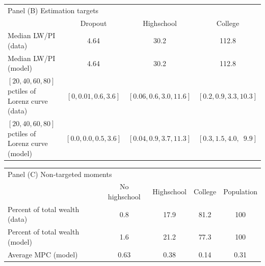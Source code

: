 \documentclass[11pt]{article}
\begin{document}
\begin{table}[th]
\begin{center}
	\begin{tabular}{lccc}
	\multicolumn{4}{l}{Panel (B) Estimation targets} \\ 
	& Dropout & Highschool & College \\ \midrule
	Median LW/PI (data) & 4.64 & 30.2 & 112.8 \\ 
	Median LW/PI (model) & 4.64 & 30.2 & 112.8 \\
	 $[20,40,60,80]$ pctiles of Lorenz curve (data) & $[0, 0.01, 0.6, 3.6]$ & $[0.06, 0.6, 3.0, 11.6]$ & $[0.2, 0.9, 3.3, 10.3]$ \\
	$[20,40,60,80]$ pctiles of Lorenz curve (model) & $[0.0, 0.0, 0.5, 3.6]$ & $[0.04, 0.9, 3.7, 11.3]$ & $[0.3, 1.5, 4.0, \phantom{0}9.9]$
	\\ \bottomrule 
	\end{tabular}
\end{center}
\end{table}

\begin{table}[th]
\begin{center}		
	\begin{tabular}{lcccc}
	\multicolumn{5}{l}{Panel (C) Non-targeted moments} \\ 
	& No highschool & Highschool & College & Population \\ \midrule
	Percent of total wealth (data) & 0.8 & 17.9 & 81.2 & 100 \\
	Percent of total wealth (model) & 1.6 & 21.2 & 77.3 & 100 \\
	Average MPC (model) & 0.63 & 0.38 & 0.14 & 0.31
	\\ \bottomrule 
	\end{tabular}
\end{center}
\end{table}
	
	
\end{document}
